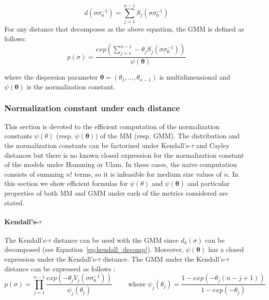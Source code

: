 \documentclass[article,nojss]{jss}
\begin{document}
\begin{equation}
 d(\sigma\sigma_0^{-1}) = \sum_{j=1}^{n-1}S_j(\sigma\sigma_0^{-1})	
 \label{eq:dist_decom}
\end{equation}
For any distance that decomposes as the above equation, the GMM is defined as follows:
\begin{equation}
 p(\sigma) =\frac{ exp(\sum _{j=1}^{n-1}-\theta_j S_j(\sigma \sigma_0^{-1}))}{\psi(\boldsymbol \theta)} 
\nonumber 
 \end{equation}

\noindent 
where the dispersion parameter $\boldsymbol \theta = (\theta_1 , \ldots , \theta_{n-1})$ is multidimensional and $\psi(\boldsymbol \theta)$ is the normalization constant. 

\subsubsection{Normalization constant under each distance}%

This section is devoted to the efficient computation of the normalization constants $\psi(\theta)$ (resp. $\psi(\boldsymbol \theta)$) of the MM (resp. GMM). The distribution and the normalization constants can be factorized under Kendall's-$\tau$ and Cayley distances but there is no known closed expression for the normalization constant of the models under Hamming or Ulam. In these cases, the naive computation consists of summing $n!$ terms, so it is infeasible for medium size values of $n$. In this section we show efficient formulas for $\psi(\theta)$ and $\psi(\boldsymbol\theta)$ and particular properties of both MM and GMM under each of the metrics considered are stated. 

\paragraph{Kendall's-$\tau$}
The Kendall's-$\tau$ distance can be used with the GMM since $d_k(\sigma)$ can be decomposed (see Equation~\eqref{eq:kendall_decomp}). Moreover, $\psi(\boldsymbol\theta)$ has a closed expression under the Kendall's-$\tau$ distance. The GMM under the Kendall's-$\tau$ distance can be expressed as follows \citep{gMallows}:
\begin{equation}
	p(\sigma) =  \prod _{j=1}^{n-1} \frac{exp(-\theta_j V_j(\sigma \sigma_0^{-1})) }{\psi_j(\theta_j)} 
  \quad \quad \text{ where } \psi_j(\theta_j) = \frac{1-exp(-\theta_j (n-j+1))}{1-exp(-\theta_j)}	
  \label{eq:gmm_kendall}
\end{equation}
\end{document}
